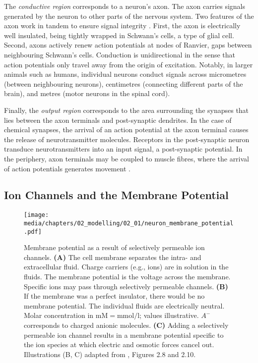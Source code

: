 The \emph{conductive region} corresponds to a neuron's axon.
The axon carries signals generated by the neuron to other parts of the nervous system.
Two features of the axon work in tandem to ensure signal integrity \citep[Chapter~7]{kandel2012principles}.
First, the axon is electrically well insulated, being tightly wrapped in Schwann's cells, a type of glial cell.
Second, axons actively renew action potentials at nodes of Ranvier, gaps between neighbouring Schwann's cells.
Conduction is unidirectional in the sense that action potentials only travel away from the origin of excitation.
Notably, in larger animals such as humans, individual neurons conduct signals across micrometres (between neighbouring neurons), centimetres (connecting different parts of the brain), and metres (motor neurons in the spinal cord).%

Finally, the \emph{output region} corresponds to the area surrounding the synapses that lies between the axon terminals and post-synaptic dendrites.
In the case of chemical synapses, the arrival of an action potential at the axon terminal causes the release of neurotransmitter molecules.
Receptors in the post-synaptic neuron transduce neurotransmitters into an input signal, a post-synaptic potential.
In the periphery, axon terminals may be coupled to muscle fibres, where the arrival of action potentials generates movement \citep[Chapter~8~\&~9]{kandel2012principles}.

\subsection{Ion Channels and the Membrane Potential}
\label{sec:membrane_potential}

\begin{figure}
	\centering
	{\label{fig:neuron_membrane_potential_membrane}}%
	{\label{fig:neuron_membrane_potential_membrane_isolated}}%
	{\label{fig:neuron_membrane_potential_membrane_channel}}%
	\texttt{[image: media/chapters/02\_modelling/02\_01/neuron\_membrane\_potential.pdf]}
	\caption[Membrane potential as a result of selectively permeable ion channels]{
	Membrane potential as a result of selectively permeable ion channels.
	\textbf{(A)} The cell membrane separates the intra- and extracellular fluid. Charge carriers (e.g., ions) are in solution in the fluids. The membrane potential is the voltage \vMem across the membrane.
	Specific ions may pass through selectively permeable channels.
	\textbf{(B)} If the membrane was a perfect insulator, there would be no membrane potential.
	The individual fluids are electrically neutral.
	Molar concentration in $\mathrm{mM} = \si{\milli\mole\per\litre}$; values illustrative. $A^-$ corresponds to charged anionic molecules.	
	\textbf{(C)} Adding a selectively permeable ion channel results in a membrane potential specific to the ion species at which electric and osmotic forces cancel out.
	Illustrations (B, C) adapted from \citet{reichert2000neurobiologie}, Figures 2.8 and 2.10.}
\end{figure}


